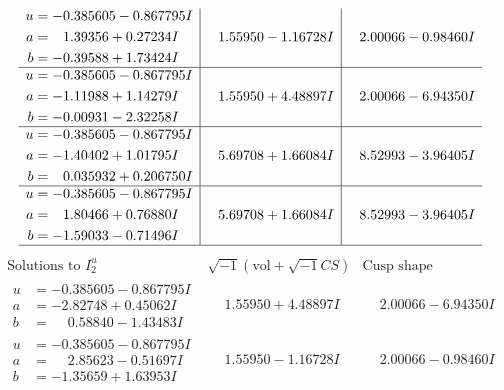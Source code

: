 \documentclass[1p]{elsarticle_modified}
\theoremstyle{definition}
\newcommand{\I}{\sqrt{-1}}
\begin{document}
$$\begin{array}{c|c|c}
\begin{aligned}
u &= -0.385605 - 0.867795 I \\
a &= \phantom{-}1.39356 + 0.27234 I \\
b &= -0.39588 + 1.73424 I\end{aligned}
 & \phantom{-}1.55950 - 1.16728 I & \phantom{-}2.00066 - 0.98460 I \\ \hline\begin{aligned}
u &= -0.385605 - 0.867795 I \\
a &= -1.11988 + 1.14279 I \\
b &= -0.00931 - 2.32258 I\end{aligned}
 & \phantom{-}1.55950 + 4.48897 I & \phantom{-}2.00066 - 6.94350 I \\ \hline\begin{aligned}
u &= -0.385605 - 0.867795 I \\
a &= -1.40402 + 1.01795 I \\
b &= \phantom{-}0.035932 + 0.206750 I\end{aligned}
 & \phantom{-}5.69708 + 1.66084 I & \phantom{-}8.52993 - 3.96405 I \\ \hline\begin{aligned}
u &= -0.385605 - 0.867795 I \\
a &= \phantom{-}1.80466 + 0.76880 I \\
b &= -1.59033 - 0.71496 I\end{aligned}
 & \phantom{-}5.69708 + 1.66084 I & \phantom{-}8.52993 - 3.96405 I\\
 \hline 
 \end{array}$$\newpage$$\begin{array}{c|c|c}  
\text{Solutions to }I^u_{2}& \I (\text{vol} + \sqrt{-1}CS) & \text{Cusp shape}\\
 \hline 
\begin{aligned}
u &= -0.385605 - 0.867795 I \\
a &= -2.82748 + 0.45062 I \\
b &= \phantom{-}0.58840 - 1.43483 I\end{aligned}
 & \phantom{-}1.55950 + 4.48897 I & \phantom{-}2.00066 - 6.94350 I \\ \hline\begin{aligned}
u &= -0.385605 - 0.867795 I \\
a &= \phantom{-}2.85623 - 0.51697 I \\
b &= -1.35659 + 1.63953 I\end{aligned}
 & \phantom{-}1.55950 - 1.16728 I & \phantom{-}2.00066 - 0.98460 I \\ \hline\begin{aligned}

\end{aligned}
\end{array}$$
\end{document}
